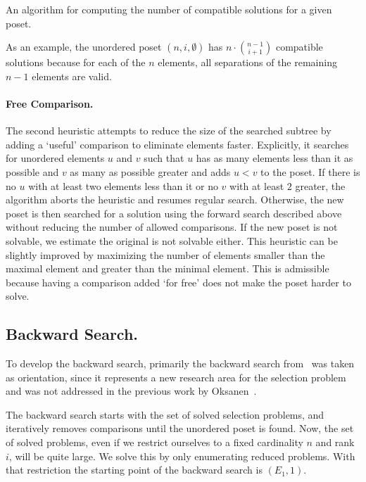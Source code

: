 \documentclass[twoside,leqno,twocolumn]{article}
\begin{document}
\begin{algorithm}[t]
  \centering
  
  \caption{An algorithm for computing the number of compatible solutions for a given poset.}
  \label{algo:compatible_solutions}
\end{algorithm}

As an example, the unordered poset $(n,i,\emptyset)$ has $n \cdot \binom{n - 1}{i + 1}$ compatible solutions because for each of the $n$ elements, all separations of the remaining $n - 1$ elements are valid.


\paragraph{Free Comparison.}
The second heuristic attempts to reduce the size of the searched subtree by adding a `useful' comparison to eliminate elements faster.
Explicitly, it searches for unordered elements $u$ and $v$ such that $u$ has as many elements less than it as possible and $v$ as many as possible greater and adds $u < v$ to the poset.
If there is no $u$ with at least two elements less than it or no $v$ with at least $2$ greater, the algorithm aborts the heuristic and resumes regular search.
Otherwise, the new poset is then searched for a solution using the forward search described above without reducing the number of allowed comparisons.
If the new poset is not solvable, we estimate the original is not solvable either.
This heuristic can be slightly improved by maximizing the number of elements smaller than the maximal element and greater than the minimal element.
This is admissible because having a comparison added `for free' does not make the poset harder to solve.

\subsection{Backward Search.} \label{sec:backward}
To develop the backward search, primarily the backward search from~\cite{stober2022lower} was taken as orientation, since it represents a new research area for the selection problem and was not addressed in the previous work by Oksanen~\cite{Oksanen}.

The backward search starts with the set of solved selection problems, and iteratively removes comparisons until the unordered poset is found.
Now, the set of solved problems, even if we restrict ourselves to a fixed cardinality $n$ and rank $i$, will be quite large.
We solve this by only enumerating reduced problems.
With that restriction the starting point of the backward search is $(E_1, 1)$.
\end{document}
